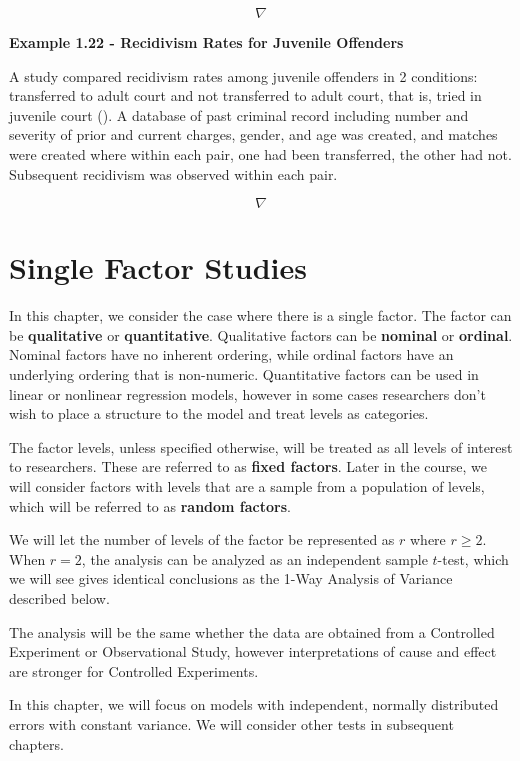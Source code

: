 \documentclass[
]{book}
\begin{document}
\[\nabla\]

\textbf{Example 1.22 - Recidivism Rates for Juvenile Offenders}

A study compared recidivism rates among juvenile offenders in 2
conditions: transferred to adult court and not transferred to adult
court, that is, tried in juvenile court
(). A database of past
criminal record including number and severity of prior and current
charges, gender, and age was created, and matches were created where
within each pair, one had been transferred, the other had not.
Subsequent recidivism was observed within each pair.

\[\nabla\]

\chapter{Single Factor Studies}\label{single-factor-studies}

In this chapter, we consider the case where there is a single factor.
The factor can be \textbf{qualitative} or \textbf{quantitative}.
Qualitative factors can be \textbf{nominal} or \textbf{ordinal}. Nominal
factors have no inherent ordering, while ordinal factors have an
underlying ordering that is non-numeric. Quantitative factors can be
used in linear or nonlinear regression models, however in some cases
researchers don't wish to place a structure to the model and treat
levels as categories.

The factor levels, unless specified otherwise, will be treated as all
levels of interest to researchers. These are referred to as
\textbf{fixed factors}. Later in the course, we will consider factors
with levels that are a sample from a population of levels, which will be
referred to as \textbf{random factors}.

We will let the number of levels of the factor be represented as \(r\)
where \(r \geq 2\). When \(r=2\), the analysis can be analyzed as an
independent sample \(t\)-test, which we will see gives identical
conclusions as the 1-Way Analysis of Variance described below.

The analysis will be the same whether the data are obtained from a
Controlled Experiment or Observational Study, however interpretations of
cause and effect are stronger for Controlled Experiments.

In this chapter, we will focus on models with independent, normally
distributed errors with constant variance. We will consider other tests
in subsequent chapters.
\end{document}
